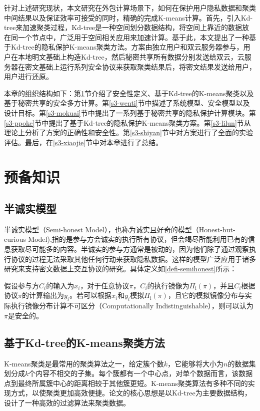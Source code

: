 针对上述研究现状，本文研究在外包计算场景下，如何在保护用户隐私数据和聚类中间结果以及保证效率可接受的同时，精确的完成K-means计算。首先，引入Kd-tree来加速聚类过程，Kd-tree是一种空间划分数据结构，将空间上靠近的数据放在同一个节点中，广泛用于空间相关应用来加速计算。基于此，本文提出了一种基于Kd-tree的隐私保护K-means聚类方法。方案由独立用户和双云服务器参与，用户在本地明文基础上构造Kd-tree，然后秘密共享所有数据分别发送给双云，云服务器在密文基础上运行系列安全协议来获取聚类结果后，将密文结果发送给用户，用户进行还原。

本章的组织结构如下：第\ref{s3-yubei}节介绍了安全性定义、基于Kd-tree的K-means聚类以及基于秘密共享的安全多方计算。第\ref{s3-wenti}节中描述了系统模型、安全模型以及设计目标。第\ref{s3-mokuai}节中提出了一系列基于秘密共享的隐私保护计算模块。第\ref{s3-ppokc}节中提出了基于Kd-tree的隐私保护K-means聚类方案。第\ref{s3-lilun}节从理论上分析了方案的正确性和安全性。第\ref{s3-shiyan}节中对方案进行了全面的实验评估。最后，在\ref{s3-xiaojie}节中对本章进行了总结。
\section{预备知识}
\label{s3-yubei}
\subsection{半诚实模型}
\label{s3-anquanmoxing}
半诚实模型（Semi-honest Model），也称为诚实且好奇的模型（Honest-but-curious Model),指的是参与方会诚实的执行所有协议，但会竭尽所能利用已有的信息获取尽可能多的内容。半诚实的参与方通常是被动的，因为他们除了通过观察执行协议的过程无法采取其他任何行动来获取隐私数据。这样的模型广泛应用于诸多研究来支持密文数据上交互协议的研究。具体定义\cite{oded2009foundations}如\ref{defi-semihonest}所示：

\begin{definition}
	\label{defi-semihonest}
	假设参与方$ C_i $的输入为$ x_i $，对于任意协议$ \pi $，$ C_i $的执行镜像为$\Pi_{\mathrm{i}}(\pi)$，并且$ C_i $根据协议$ \pi $的计算输出为$ y_i$。若可以根据$ x_i $和$ y_i $模拟$\Pi_{\mathrm{i}}(\pi)$，且它的模拟镜像分布与实际执行镜像分布计算不可区分（Computationally Indistinguishable），则可以认为$ \pi $是安全的。
\end{definition}

\subsection{基于Kd-tree的K-means聚类方法}
K-means聚类是最常用的聚类算法之一，给定簇个数$ k $，它能够将大小为$ n $的数据集划分成$ k $个内容不相交的子集。每个簇都有一个中心点，对单个数据而言，该数据点到最终所属簇中心的距离相较于其他簇更短。K-means聚类算法有多种不同的实现方式，以使聚类更加高效便捷。论文\cite{kanungo2002efficient}的核心思想是以Kd-tree为主要数据结构，设计了一种高效的过滤算法来聚类数据。


